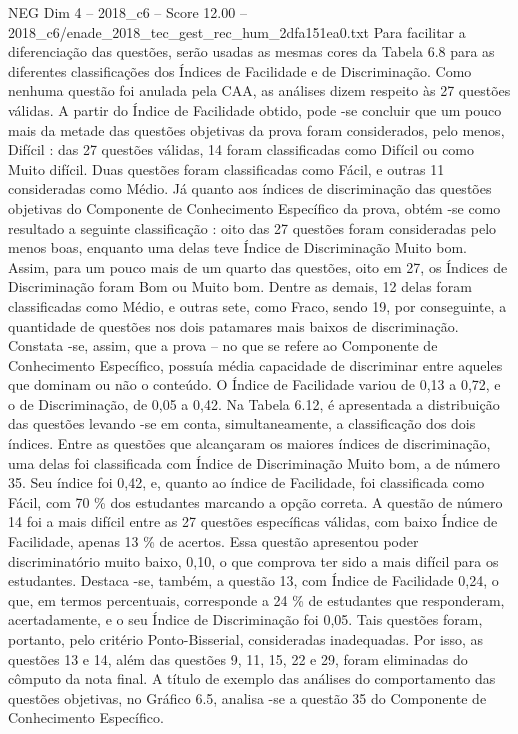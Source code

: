 \begin{textsample}{NEG Dim 4 – 2018\_c6 – Score 12.00 – 2018\_c6/enade\_2018\_tec\_gest\_rec\_hum\_2dfa151ea0.txt}
Para facilitar a diferenciação das questões, serão usadas as mesmas cores da Tabela 6.8 para as diferentes classificações dos Índices de Facilidade e de Discriminação.
Como nenhuma questão foi anulada pela CAA, as análises dizem respeito às 27 questões válidas.
A partir do Índice de Facilidade obtido, pode -se concluir que um pouco mais da metade das questões objetivas da prova foram considerados, pelo menos, Difícil : das 27 questões válidas, 14 foram classificadas como Difícil ou como Muito difícil.
Duas questões foram classificadas como Fácil, e outras 11 consideradas como Médio.
Já quanto aos índices de discriminação das questões objetivas do Componente de Conhecimento Específico da prova, obtém -se como resultado a seguinte classificação : oito das 27 questões foram consideradas pelo menos boas, enquanto uma delas teve Índice de Discriminação Muito bom.
Assim, para um pouco mais de um quarto das questões, oito em 27, os Índices de Discriminação foram Bom ou Muito bom.
Dentre as demais, 12 delas foram classificadas como Médio, e outras sete, como Fraco, sendo 19, por conseguinte, a quantidade de questões nos dois patamares mais baixos de discriminação.
Constata -se, assim, que a prova – no que se refere ao Componente de Conhecimento Específico, possuía média capacidade de discriminar entre aqueles que dominam ou não o conteúdo.
O Índice de Facilidade variou de 0,13 a 0,72, e o de Discriminação, de 0,05 a 0,42.
Na Tabela 6.12, é apresentada a distribuição das questões levando -se em conta, simultaneamente, a classificação dos dois índices.
Entre as questões que alcançaram os maiores índices de discriminação, uma delas foi classificada com Índice de Discriminação Muito bom, a de número 35.
Seu índice foi 0,42, e, quanto ao índice de Facilidade, foi classificada como Fácil, com 70 \% dos estudantes marcando a opção correta.
A questão de número 14 foi a mais difícil entre as 27 questões específicas válidas, com baixo Índice de Facilidade, apenas 13 \% de acertos.
Essa questão apresentou poder discriminatório muito baixo, 0,10, o que comprova ter sido a mais difícil para os estudantes.
Destaca -se, também, a questão 13, com Índice de Facilidade 0,24, o que, em termos percentuais, corresponde a 24 \% de estudantes que responderam, acertadamente, e o seu Índice de Discriminação foi 0,05.
Tais questões foram, portanto, pelo critério Ponto-Bisserial, consideradas inadequadas.
Por isso, as questões 13 e 14, além das questões 9, 11, 15, 22 e 29, foram eliminadas do cômputo da nota final.
A título de exemplo das análises do comportamento das questões objetivas, no Gráfico 6.5, analisa -se a questão 35 do Componente de Conhecimento Específico.

\end{textsample}
